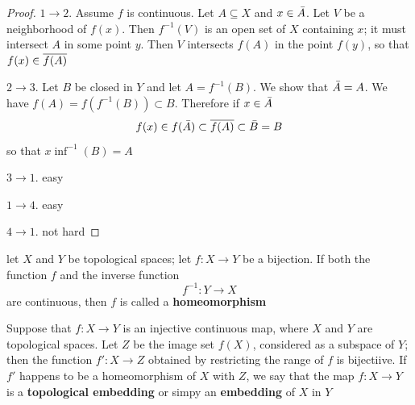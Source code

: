 \documentclass[11pt]{article}
\begin{document}
\begin{proof}
\(1\to 2\). Assume \(f\) is continuous. Let \(A\subseteq X\) and \(x\in\bar{A}\). Let \(V\) be a neighborhood
of \(f(x)\). Then \(f^{-1}(V)\) is an open set of \(X\) containing \(x\);  it must
intersect \(A\) in some point \(y\). Then \(V\) intersects \(f(A)\) in the point \(f(y)\), so
that \(f(x)\in\overline{f(A)}\)

\(2\to 3\). Let \(B\) be closed in \(Y\) and let \(A=f^{-1}(B)\). We show that \(\bar{A}=A\). We have
\(f(A)=f(f^{-1}(B))\subset B\). Therefore if \(x\in\bar{A}\)
\begin{equation*}
f(x)\in f(\bar{A})\subset\overline{f(A)}\subset\bar{B}=B
\end{equation*}
so that \(x\inf^{-1}(B)=A\)

\(3\to 1\). easy

\(1\to 4\). easy

\(4\to 1\). not hard 
\end{proof}

let \(X\) and \(Y\) be topological spaces; let \(f:X\to Y\) be a bijection. If both the
function \(f\) and the inverse function
\begin{equation*}
f^{-1}:Y\to X
\end{equation*}
are continuous, then \(f\) is called a \textbf{homeomorphism}

Suppose that \(f:X\to Y\) is an injective continuous map, where \(X\) and \(Y\) are topological
spaces. Let \(Z\) be the image set \(f(X)\), considered as a subspace of \(Y\); then the
function \(f':X\to Z\) obtained by restricting the range of \(f\)  is bijectiive. If \(f'\) happens
to be a homeomorphism of \(X\) with \(Z\), we say that the map \(f:X\to Y\) is a
\textbf{topological embedding} or simpy an \textbf{embedding} of \(X\) in \(Y\)
\end{document}

